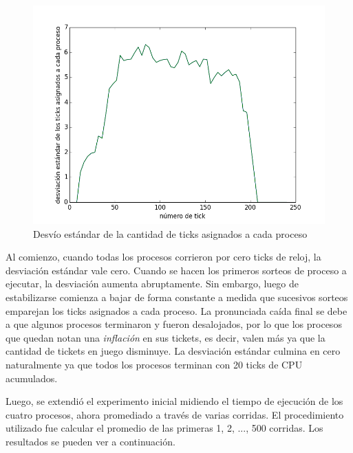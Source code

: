 \documentclass[11pt, a4paper, twoside]{article}
\begin{document}
\begin{figure}[H]
\centering
\includegraphics[width=\textwidth]{../experimentacion/ej9-fairness/fairness/plot.png}
\caption{Desvío estándar de la cantidad de ticks asignados a cada proceso}
\end{figure}

Al comienzo, cuando todas los procesos corrieron por cero ticks de reloj, la desviación estándar vale cero. Cuando se hacen los primeros sorteos de proceso a ejecutar, la desviación aumenta abruptamente. Sin embargo, luego de estabilizarse comienza a bajar de forma constante a medida que sucesivos sorteos emparejan los ticks asignados a cada proceso. La pronunciada caída final se debe a que algunos procesos terminaron y fueron desalojados, por lo que los procesos que quedan notan una \textit{inflación} en sus tickets, es decir, valen más ya que la cantidad de tickets en juego disminuye. La desviación estándar culmina en cero naturalmente ya que todos los procesos terminan con 20 ticks de CPU acumulados.

Luego, se extendió el experimento inicial midiendo el tiempo de ejecución de los cuatro procesos, ahora promediado a través de varias corridas. El procedimiento utilizado fue calcular el promedio de las primeras 1, 2, ..., 500 corridas. Los resultados se pueden ver a continuación.
\end{document}

